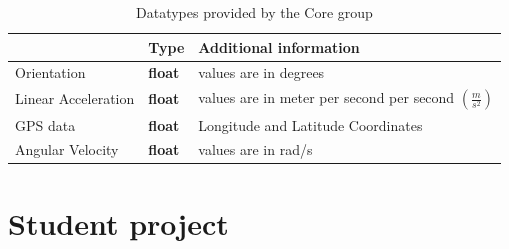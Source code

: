 \documentclass[]{scrreprt}
\begin{document}
	\begin{table}[H]
		\centering
		\begin{tabular}{|l|l|l|}
			\hline 
			& Type & Additional information \\ 
			\hline \hline
			Orientation & \textbf{float} & values are in degrees \\ 
			\hline 
			Linear Acceleration & \textbf{float} & values are in meter per second per second $(\frac{m}{s^2})$ \\ 
			\hline 
			GPS data & \textbf{float} & Longitude and Latitude Coordinates \\ 
			\hline 
			Angular Velocity & \textbf{float} & values are in rad/s \\ 
			\hline 
		\end{tabular} 
		\caption[Interfaces IV]{Datatypes provided by the Core group}
		\label{tab:IntCore}
	\end{table}



\chapter{Student project}

\listoffigures
\listoftables
	
\end{document}
